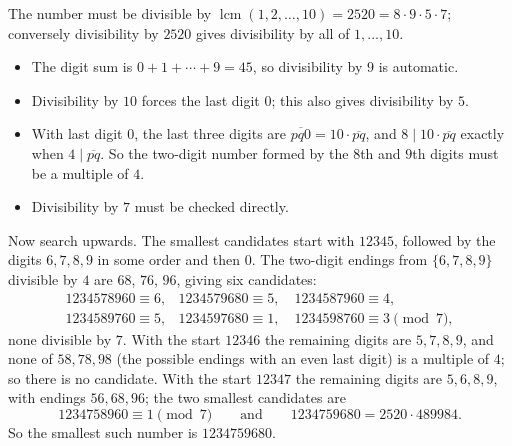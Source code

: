 The number must be divisible by $\operatorname{lcm}(1,2,\dots,10)=2520=8\cdot9\cdot5\cdot7$; conversely divisibility by $2520$ gives divisibility by all of $1,\dots,10$.
\begin{itemize}
\item The digit sum is $0+1+\cdots+9=45$, so divisibility by $9$ is automatic.
\item Divisibility by $10$ forces the last digit $0$; this also gives divisibility by $5$.
\item With last digit $0$, the last three digits are $\overline{pq0}=10\cdot\overline{pq}$, and $8\mid10\cdot\overline{pq}$ exactly when $4\mid\overline{pq}$. So the two-digit number formed by the $8$th and $9$th digits must be a multiple of $4$.
\item Divisibility by $7$ must be checked directly.
\end{itemize}
Now search upwards. The smallest candidates start with $12345$, followed by the digits $6,7,8,9$ in some order and then $0$. The two-digit endings from $\{6,7,8,9\}$ divisible by $4$ are $68$, $76$, $96$, giving six candidates:
\[
\begin{array}{ll}
1234578960\equiv6, & 1234579680\equiv5,\quad 1234587960\equiv4,\\
1234589760\equiv5, & 1234597680\equiv1,\quad 1234598760\equiv3 \pmod 7,
\end{array}
\]
none divisible by $7$. With the start $12346$ the remaining digits are $5,7,8,9$, and none of $58,78,98$ (the possible endings with an even last digit) is a multiple of $4$; so there is no candidate. With the start $12347$ the remaining digits are $5,6,8,9$, with endings $56,68,96$; the two smallest candidates are
\[
1234758960\equiv1\pmod7\qquad\text{and}\qquad 1234759680=2520\cdot489984 .
\]
So the smallest such number is $\boxed{1234759680}$.

